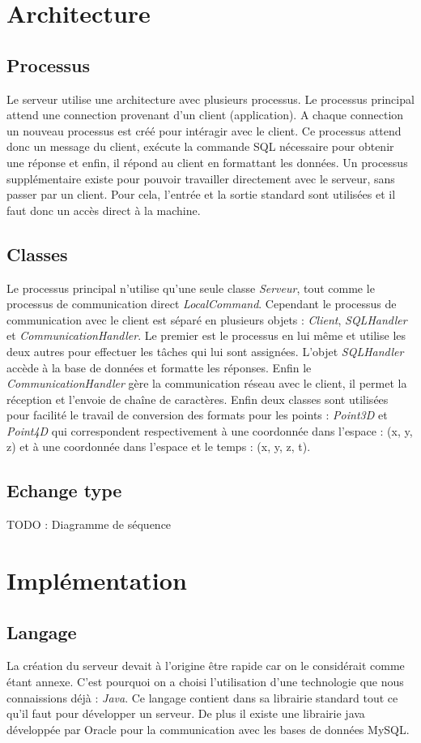 \documentclass[a4paper, 12pt]{report}
\begin{document}
\section{Architecture}
	\subsection{Processus}
		Le serveur utilise une architecture avec plusieurs processus. Le processus principal attend une connection provenant d'un client (application).
		A chaque connection un nouveau processus est créé pour intéragir avec le client. Ce processus attend donc un message du client, exécute la commande
		SQL nécessaire pour obtenir une réponse et enfin, il répond au client en formattant les données. Un processus supplémentaire existe pour pouvoir
		travailler directement avec le serveur, sans passer par un client. Pour cela, l'entrée et la sortie standard sont utilisées et il faut donc un accès direct à la machine.
	\subsection{Classes}
		Le processus principal n'utilise qu'une seule classe \emph{Serveur}, tout comme le processus de communication direct \emph{LocalCommand}.
		Cependant le processus de communication avec le client est séparé en plusieurs objets : \emph{Client}, \emph{SQLHandler} et \emph{CommunicationHandler}. 
		Le premier est le processus en lui même et utilise les deux autres pour effectuer les tâches qui lui sont assignées. L'objet \emph{SQLHandler} accède à la base de données et formatte les réponses.
		Enfin le \emph{CommunicationHandler} gère la communication réseau avec le client, il permet la réception et l'envoie de chaîne de caractères.
		Enfin deux classes sont utilisées pour facilité le travail de conversion des formats pour les points : \emph{Point3D} et \emph{Point4D} qui correspondent respectivement à une coordonnée dans l'espace : (x, y, z)
		et à une coordonnée dans l'espace et le temps : (x, y, z, t).
	\subsection{Echange type}
		TODO : Diagramme de séquence
\section{Implémentation}
	\subsection{Langage}
		La création du serveur devait à l'origine être rapide car on le considérait comme étant annexe. C'est pourquoi on a choisi l'utilisation d'une
		technologie que nous connaissions déjà : \emph{Java}. Ce langage contient dans sa librairie standard tout ce qu'il faut pour développer un serveur.
		De plus il existe une librairie java développée par Oracle pour la communication avec les bases de données MySQL.
\end{document}
